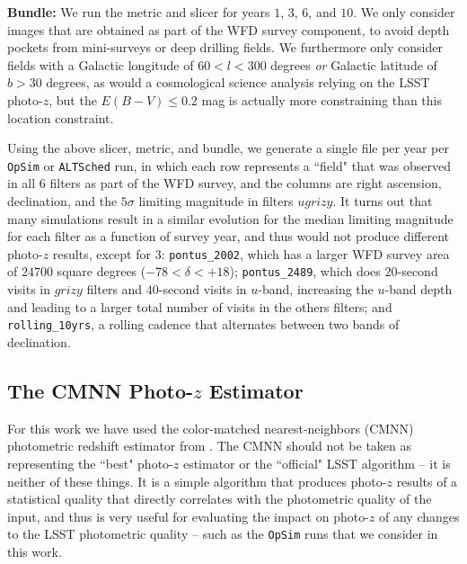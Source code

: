 {\bf Bundle:} We run the metric and slicer for years $1$, $3$, $6$, and $10$. We only consider images that are obtained as part of the WFD survey component, to avoid depth pockets from mini-surveys or deep drilling fields. We furthermore only consider fields with a Galactic longitude of $60 < l < 300$ degrees {\em or} Galactic latitude of $b>30$ degrees, as would a cosmological science analysis relying on the LSST photo-$z$, but the $E(B-V) \leq 0.2$ mag is actually more constraining than this location constraint.

Using the above slicer, metric, and bundle, we generate a single file per year per {\tt OpSim} or {\tt ALTSched} run, in which each row represents a ``field" that was observed in all $6$ filters as part of the WFD survey, and the columns are right ascension, declination, and the $5{\sigma}$ limiting magnitude in filters $ugrizy$. It turns out that many simulations result in a similar evolution for the median limiting magnitude for each filter as a function of survey year, and thus would not produce different photo-$z$ results, except for 3: {\tt pontus\_2002}, which has a larger WFD survey area of $24700$ square degrees ($-78 < \delta < +18$); {\tt pontus\_2489}, which does $20$-second visits in $grizy$ filters and $40$-second visits in $u$-band, increasing the $u$-band depth and leading to a larger total number of visits in the others filters; and {\tt rolling_10yrs}, a rolling cadence that alternates between two bands of declination. 


\subsection{The CMNN Photo-$z$ Estimator}\label{ssec:pz_exp_cmnn}

For this work we have used the color-matched nearest-neighbors (CMNN) photometric redshift estimator from \cite[][herafter G18]{2018AJ....155....1G}. The CMNN should not be taken as representing the ``best" photo-$z$ estimator or the ``official" LSST algorithm -- it is neither of these things. It is a simple algorithm that produces photo-$z$ results of a statistical quality that directly correlates with the photometric quality of the input, and thus is very useful for evaluating the impact on photo-$z$ of any changes to the LSST photometric quality -- such as the {\tt OpSim} runs that we consider in this work.

